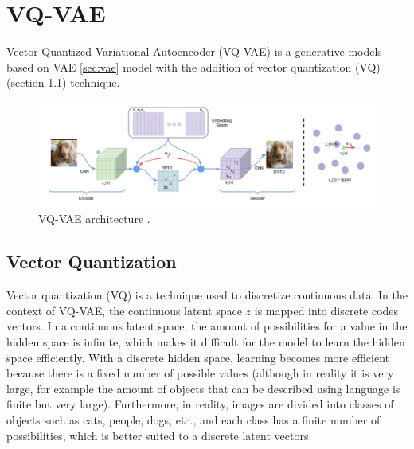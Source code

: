\section{VQ-VAE}
\label{sec:vqvae}

Vector Quantized Variational Autoencoder (VQ-VAE) \cite{vqvae} is a generative models based on VAE \ref{sec:vae} model with the addition of vector quantization (VQ) (section \ref{subsec:vqvae_vq}) technique. 

\begin{figure}[h]
    \centering
    \includegraphics[scale=0.4]{images/vqvae_architecture.png}
    \caption{VQ-VAE architecture \cite{vqvae}.}
    \label{fig:vqvae}
\end{figure}

\subsection{Vector Quantization}
\label{subsec:vqvae_vq}

Vector quantization (VQ) is a technique used to discretize continuous data. In the context of VQ-VAE, the continuous latent space $z$ is mapped into discrete codes vectors. In a continuous latent space, the amount of possibilities for a value in the hidden space is infinite, which makes it difficult for the model to learn the hidden space efficiently. With a discrete hidden space, learning becomes more efficient because there is a fixed number of possible values (although in reality it is very large, for example the amount of objects that can be described using language is finite but very large). Furthermore, in reality, images are divided into classes of objects such as cats, people, dogs, etc., and each class has a finite number of possibilities, which is better suited to a discrete latent vectors.

